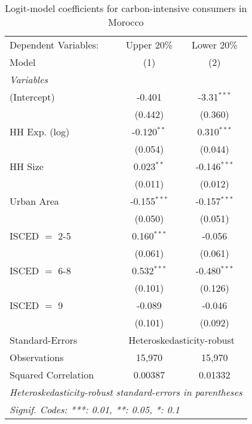 
\begin{table}[htbp!]
   \centering
   \small
   \begin{adjustbox}{width = 1\textwidth, max height = 0.95\textheight, center}
      \begin{threeparttable}[b]
         \caption{\label{tab:Logit_1_MAR} Logit-model coefficients for carbon-intensive consumers in Morocco}
         \begin{tabular}{lcc}
            \tabularnewline \midrule \midrule
            Dependent Variables: & Upper 20\%     & Lower 20\%\\   
            Model                & (1)            & (2)\\  
            \midrule
            \emph{Variables}\\
            (Intercept)          & -0.401         & -3.31$^{***}$\\   
                                 & (0.442)        & (0.360)\\   
            HH Exp. (log)        & -0.120$^{**}$  & 0.310$^{***}$\\   
                                 & (0.054)        & (0.044)\\   
            HH Size              & 0.023$^{**}$   & -0.146$^{***}$\\   
                                 & (0.011)        & (0.012)\\   
            Urban Area           & -0.155$^{***}$ & -0.157$^{***}$\\   
                                 & (0.050)        & (0.051)\\   
            ISCED $=$ 2-5        & 0.160$^{***}$  & -0.056\\   
                                 & (0.061)        & (0.061)\\   
            ISCED $=$ 6-8        & 0.532$^{***}$  & -0.480$^{***}$\\   
                                 & (0.101)        & (0.126)\\   
            ISCED $=$ 9          & -0.089         & -0.046\\   
                                 & (0.101)        & (0.092)\\   
            \midrule 
            Standard-Errors & \multicolumn{2}{c}{Heteroskedasticity-robust} \\ 
            Observations         & 15,970         & 15,970\\  
            Squared Correlation  & 0.00387        & 0.01332\\  
            \midrule \midrule
            \multicolumn{3}{l}{\emph{Heteroskedasticity-robust standard-errors in parentheses}}\\
            \multicolumn{3}{l}{\emph{Signif. Codes: ***: 0.01, **: 0.05, *: 0.1}}\\
         \end{tabular}
         

\end{threeparttable}
\end{adjustbox}
\end{table}
